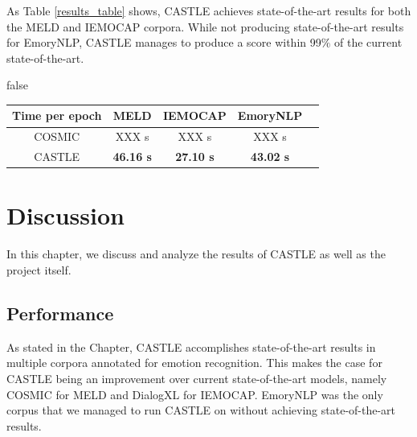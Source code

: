 \documentclass[nofilelist]{cslthse-msc}
\begin{document}
As Table \ref{results_table} shows, CASTLE achieves state-of-the-art results for both the MELD and IEMOCAP corpora. While not producing state-of-the-art results for EmoryNLP, CASTLE manages to produce a score within 99$\%$ of the current state-of-the-art.





\ifx false
\begin{table}[h!]
\begin{tabular}{|c|c|c|c|c|}
\hline
Time per epoch & MELD             & IEMOCAP          & EmoryNLP          \\ \hline
COSMIC         & XXX s            & XXX s          & XXX s                  \\ \hline
CASTLE         & \textbf{46.16 s} & \textbf{27.10 s} & \textbf{43.02 s}       \\ \hline
\end{tabular}
\end{table}
\fi





\chapter{Discussion}
In this chapter, we discuss and analyze the results of CASTLE as well as the project itself. 







\section{Performance}

As stated in the  Chapter, CASTLE accomplishes state-of-the-art results in multiple corpora annotated for emotion recognition. This makes the case for CASTLE being an improvement over current state-of-the-art models, namely COSMIC for MELD and DialogXL for IEMOCAP. EmoryNLP was the only corpus that we managed to run CASTLE on without achieving state-of-the-art results. 
\end{document}
